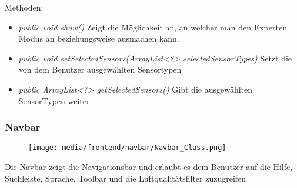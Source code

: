 Methoden:
\begin{itemize} 
    \item \emph{public void show()} Zeigt die Möglichkeit an, an welcher man den Experten Modus an beziehungsweise ausmachen kann.
    \item \emph{public void setSelectedSensors(ArrayList<?> selectedSensorTypes)} Setzt die von dem Benutzer ausgewählten Sensortypen
    \item \emph{public ArrayList<?> getSelectedSensors()} Gibt die ausgewählten SensorTypen weiter.
\end{itemize}

\subsubsection{Navbar}
\begin{minipage}{0.3\textwidth}
    \begin{figure}[H]
        \texttt{[image: media/frontend/navbar/Navbar\_Class.png]}
    \end{figure}
    \end{minipage} \hfill
    \begin{minipage}{0.6\textwidth}
Die Navbar zeigt die Navigationsbar und erlaubt es dem Benutzer auf die Hilfe, Suchleiste, Sprache, Toolbar und die Luftqualitätsfilter zuzugreifen
\end{minipage}

